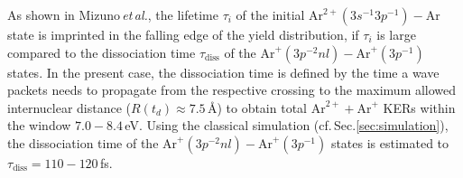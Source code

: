 \documentclass[%
 aip,
rsi,%
 amsmath,amssymb,
preprint,%
]{revtex4-1}
\begin{document}

As shown in Mizuno\,\textit{et\,al.}\cite{mizuno2017}, the lifetime $\tau_i$ of the initial $\mathrm{Ar}^{2+}(3s^{-1}3p^{-1}) - \mathrm{Ar}$ state is imprinted in the falling edge of the yield distribution, if $\tau_i$ is large compared to the dissociation time $\tau_{\mathrm{diss}}$ of the $\mathrm{Ar}^+(3p^{-2}nl)-\mathrm{Ar}^+(3p^{-1})$ states. In the present case, the dissociation time is defined by the time a wave packets needs to propagate from the respective crossing to the maximum allowed internuclear distance ($R(t_d) \approx 7.5$\,\AA) to obtain total $\mathrm{Ar}^{2+}+\mathrm{Ar}^{+}$ KERs within the window $7.0-8.4$\,eV. Using the classical simulation (cf.\,Sec.\ref{sec:simulation}), the dissociation time of the $\mathrm{Ar}^+(3p^{-2}nl)-\mathrm{Ar}^+(3p^{-1})$ states is estimated to $\tau_{\mathrm{diss}} = 110-120$\,fs. 
\end{document}
